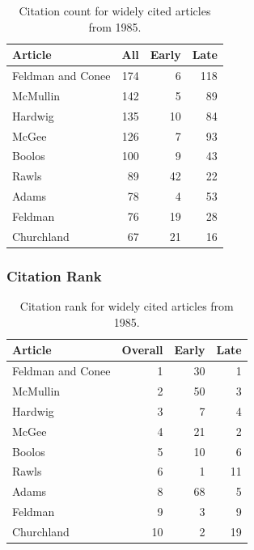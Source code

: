 \documentclass[
  10pt,
  letterpaper,
  DIV=11,
  numbers=noendperiod,
  twoside]{scrartcl}
\begin{document}
\begin{longtable}[]{@{}lrrr@{}}

\caption{\label{tbl-citation-count-1985}Citation count for widely cited
articles from 1985.}

\tabularnewline

\toprule\noalign{}
Article & All & Early & Late \\
\midrule\noalign{}
\endhead
\bottomrule\noalign{}
\endlastfoot
Feldman and Conee & 174 & 6 & 118 \\
McMullin & 142 & 5 & 89 \\
Hardwig & 135 & 10 & 84 \\
McGee & 126 & 7 & 93 \\
Boolos & 100 & 9 & 43 \\
Rawls & 89 & 42 & 22 \\
Adams & 78 & 4 & 53 \\
Feldman & 76 & 19 & 28 \\
Churchland & 67 & 21 & 16 \\

\end{longtable}

\subsubsection*{Citation Rank}\label{sec-rank-1985}

\begin{longtable}[]{@{}lrrr@{}}

\caption{\label{tbl-citation-rank-1985}Citation rank for widely cited
articles from 1985.}

\tabularnewline

\toprule\noalign{}
Article & Overall & Early & Late \\
\midrule\noalign{}
\endhead
\bottomrule\noalign{}
\endlastfoot
Feldman and Conee & 1 & 30 & 1 \\
McMullin & 2 & 50 & 3 \\
Hardwig & 3 & 7 & 4 \\
McGee & 4 & 21 & 2 \\
Boolos & 5 & 10 & 6 \\
Rawls & 6 & 1 & 11 \\
Adams & 8 & 68 & 5 \\
Feldman & 9 & 3 & 9 \\
Churchland & 10 & 2 & 19 \\

\end{longtable}
\end{document}
